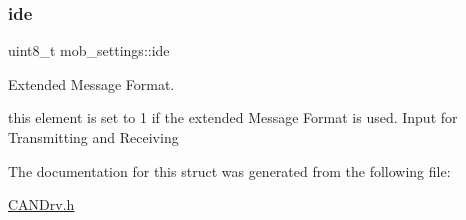 \subsubsection{\texorpdfstring{ide}{ide}}
{\footnotesize\ttfamily uint8\+\_\+t mob\+\_\+settings\+::ide}



Extended Message Format. 

this element is set to 1 if the extended Message Format is used. Input for Transmitting and Receiving 

The documentation for this struct was generated from the following file\+:\begin{DoxyCompactItemize}
\item 
\hyperlink{_c_a_n_drv_8h}{C\+A\+N\+Drv.\+h}\end{DoxyCompactItemize}
